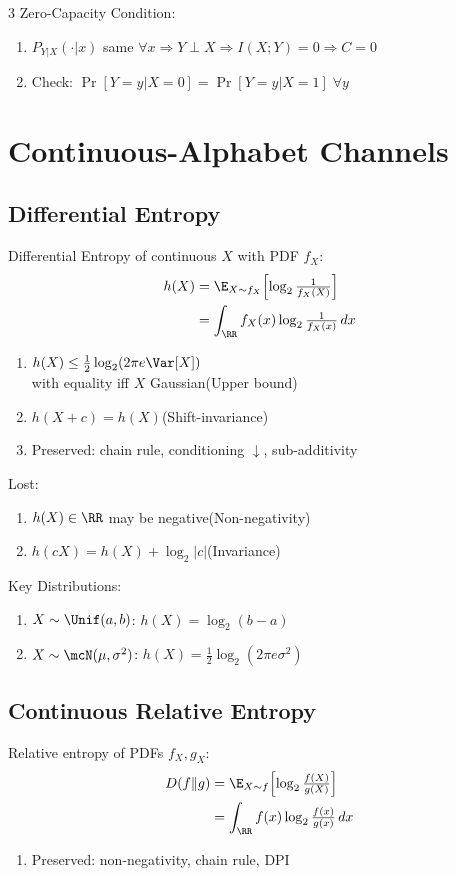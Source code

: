 \documentclass[12pt, a4paper]{article}
\begin{document}
\begin{multicols*}{3}
Zero-Capacity Condition:
\begin{enumerate}[\roman*.]
  \item $P_{Y|X}(\cdot|x)$ same $\forall x\Rightarrow Y\perp X\Rightarrow I(X;Y)=0\Rightarrow C=0$
  \item Check: $\Pr[Y=y|X=0]=\Pr[Y=y|X=1]\;\forall y$
\end{enumerate}
\colbreak
\section{Continuous-Alphabet Channels}
\subsection{Differential Entropy}
Differential Entropy of continuous $X$ with PDF $f_X$:
\begin{align*}
  h(X)&=\E_{X\sim f_X}\!\left[\log_2\tfrac{1}{f_X(X)}\right]\\ 
      &=\int_{\RR}f_X(x)\log_2\tfrac{1}{f_X(x)}\,dx
\end{align*}
\begin{enumerate}[\roman*.]
  \item $h(X) \leq \tfrac{1}{2}\log_2(2\pi e\Var[X])$\\with equality iff $X$ Gaussian\hfill(Upper bound)
  \item $h(X+c)=h(X)$\hfill(Shift-invariance)
  \item Preserved: chain rule, conditioning $\downarrow$, sub-additivity
\end{enumerate}
Lost:
\begin{enumerate}[\roman*.]
  \item $h(X)\in\RR$ may be negative\hfill(Non-negativity)
  \item $h(cX)=h(X)+\log_2|c|$\hfill(Invariance)
\end{enumerate}
 
Key Distributions:
\begin{enumerate}[\roman*.]
  \item $X\sim\Unif(a,b)$: $h(X)=\log_2(b-a)$
  \item $X\sim\mcN(\mu,\sigma^2)$: $h(X)=\tfrac{1}{2}\log_2(2\pi e\sigma^2)$
\end{enumerate}

\subsection{Continuous Relative Entropy}
Relative entropy of PDFs $f_X,g_X$:
\begin{align*}
  D(f\|g)&=\E_{X\sim f}\!\left[\log_2\tfrac{f(X)}{g(X)}\right]\\
         &=\int_{\RR}f(x)\log_2\tfrac{f(x)}{g(x)}\,dx
\end{align*}
\begin{enumerate}[\roman*.]
  \item Preserved: non-negativity, chain rule, DPI
\end{enumerate}


\end{multicols*}
\end{document}
